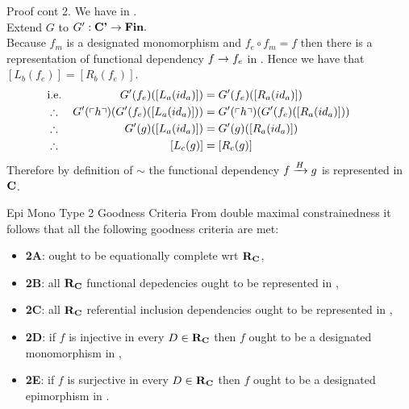 \begin{frame}{Proof cont 2.}
We have   in \catcp.\\
\medskip
Extend $G$ to $G':\catcp \morph \Fin.$ \\
Because $f_m$ is a designated monomorphism and $f_e \circ f_m = f$ then
there is a representation of functional dependency $f \morph f_e$ in \catc.
Hence  we have that $[L_b(f_e)]= [R_b(f_e)]$.
\medskip
\begin{align*}
&\mbox{i.e.}& G'(f_e)([L_a(id_a)])              &= G'(f_e)([R_a(id_a)])       \\
&\therefore & G'(\qq{h}) (G'(f_e)([L_a(id_a)])) &= G'(\qq{h}) (G'(f_e)([R_a(id_a)])) \\
&\therefore & G'(g)([L_a(id_a)])              &= G'(g)([R_a(id_a)]) & &    \\
&\therefore & [L_c(g)] &= [R_c(g)] 
\end{align*}
Therefore by definition of $\sim$ the functional dependency
$\fundep{H}{f}{g}$ is represented in $\catc$.
\end{frame}
\fi

\begin{frame}{Epi Mono Type 2 Goodness Criteria}
From double maximal constrainedness it follows that all the following goodness criteria are met: 
\begin{itemize}
\item \textbf{2A}:  \catcw ought to be equationally complete wrt $\reqtc$,         
\item \textbf{2B}:  all $\reqtc$ functional depedencies ought to be represented in \catc,
\item \textbf{2C}:  all $\reqtc$ referential inclusion dependencies ought to be represented in \catc, 
\pause \item \textbf{2D}:  if $f$ is injective in every $D \in \reqtc$ then $f$ ought to be a designated monomorphism in \catc,
\pause \item \textbf{2E}:  if $f$ is surjective in every $D \in \reqtc$ then $f$ ought to be a designated epimorphism in \catc.
\end{itemize}
\iffalse
We can also show that \textbf{2B} can be weakened. If all functional dependencies \textbf{upon edges} from sketch $S$ are represented then 
all functional dependencies are represented. \highlight{Too much information}
\fi
\end{frame}

